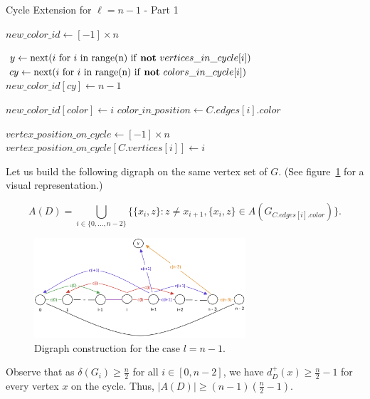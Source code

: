 \begin{algorithm}
    \caption{Cycle Extension for \( \ell = n - 1 \) - Part 1}
    \begin{algorithmic}
            \State $new\_color\_id \gets [-1] \times n$

            \State $y \gets \text{next}(i \text{ for } i \text{ in range(n) if \textbf{not} } vertices\_in\_cycle[i])$
            \State $cy \gets \text{next}(i \text{ for } i \text{ in range(n) if \textbf{not} } colors\_in\_cycle[i])$
            \State $new\_color\_id[cy] \gets n - 1$
            
                \State $new\_color\_id[color] \gets i$
                \State $color\_in\_position \gets C.edges[i].color$
            \EndFor
            
            \State $vertex\_position\_on\_cycle \gets [-1] \times n$
                \State $vertex\_position\_on\_cycle[C.vertices[i]] \gets i$
            \EndFor
        \EndFunction
    \end{algorithmic}
\end{algorithm}

Let us build the following digraph on the same vertex set of $G$. (See figure~\ref{fig:cycle_n-1_digraph} for a visual representation.)

$$
A(D) = \bigcup_{i \in \{0,..., n - 2\}} \{\{x_i, z\} : z \neq x_{i + 1}, \{x_i, z\} \in A(G_{C.edges[i].color})\}.
$$

\begin{figure}[H]
    \centering
    \includegraphics[width=0.7\textwidth]{figuras/cycle_n-1_digraph.png}
    \caption{Digraph construction for the case $l = n - 1$.}
    \label{fig:cycle_n-1_digraph}
\end{figure}

Observe that as $\delta(G_i) \geq \frac{n}{2}$ for all $i \in [0, n - 2]$, we have 
$d^+_{D}(x) \geq \frac{n}{2} - 1$ for every vertex $x$ on the cycle. Thus,
$|A(D)| \geq (n-1)(\frac{n}{2} - 1)$. 

